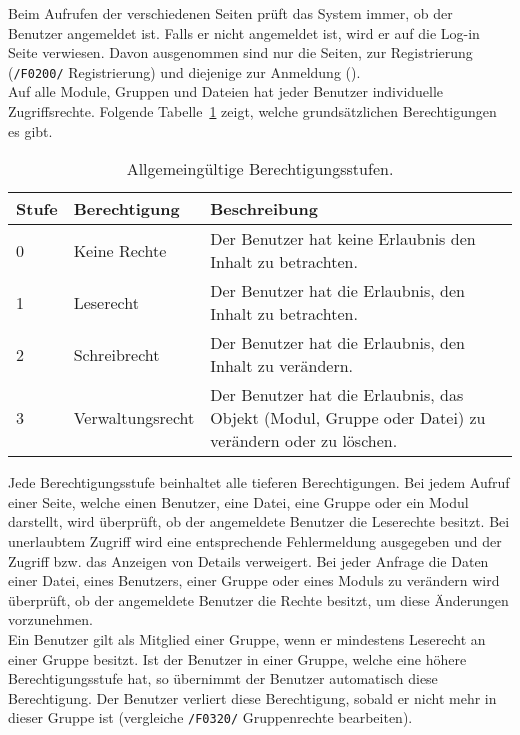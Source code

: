 Beim Aufrufen der verschiedenen Seiten prüft das System immer, ob der Benutzer angemeldet ist. Falls er nicht angemeldet ist, wird er auf die Log-in Seite verwiesen. Davon ausgenommen sind nur die Seiten, zur Registrierung (\texttt{/F0200/} Registrierung) und diejenige zur Anmeldung (). \\

Auf alle Module, Gruppen und Dateien hat jeder Benutzer individuelle Zugriffsrechte. Folgende Tabelle~\ref{tab:rights} zeigt, welche grundsätzlichen Berechtigungen es gibt.

\begin{table}[H]
\begin{tabularx}{\textwidth}{|l|l|X|} \hline
\textbf{Stufe} & \textbf{Berechtigung}     & \textbf{Beschreibung} \\ \hline
0     & Keine Rechte     & Der Benutzer hat keine Erlaubnis den Inhalt zu betrachten.\\ \hline
1     & Leserecht        & Der Benutzer hat die Erlaubnis, den Inhalt zu betrachten.\\ \hline
2     & Schreibrecht     & Der Benutzer hat die Erlaubnis, den Inhalt zu verändern.\\ \hline
3     & Verwaltungsrecht & Der Benutzer hat die Erlaubnis, das Objekt (Modul, Gruppe oder Datei) zu verändern oder zu löschen.\\ \hline
\end{tabularx}
\caption{Allgemeingültige Berechtigungsstufen.}
\label{tab:rights}
\end{table}

Jede Berechtigungsstufe beinhaltet alle tieferen Berechtigungen. Bei jedem Aufruf einer Seite, welche einen Benutzer, eine Datei, eine Gruppe oder ein Modul darstellt, wird überprüft, ob der angemeldete Benutzer die Leserechte besitzt. Bei unerlaubtem Zugriff wird eine entsprechende Fehlermeldung ausgegeben und der Zugriff bzw. das Anzeigen von Details verweigert. Bei jeder Anfrage die Daten einer Datei, eines Benutzers, einer Gruppe oder eines Moduls zu verändern wird überprüft, ob der angemeldete Benutzer die Rechte besitzt, um diese Änderungen vorzunehmen.\\

Ein Benutzer gilt als Mitglied einer Gruppe, wenn er mindestens Leserecht an einer Gruppe besitzt. Ist der Benutzer in einer Gruppe, welche eine höhere Berechtigungsstufe hat, so übernimmt der Benutzer automatisch diese Berechtigung. Der Benutzer verliert diese Berechtigung, sobald er nicht mehr in dieser Gruppe ist (vergleiche \texttt{/F0320/} Gruppenrechte bearbeiten).\\

